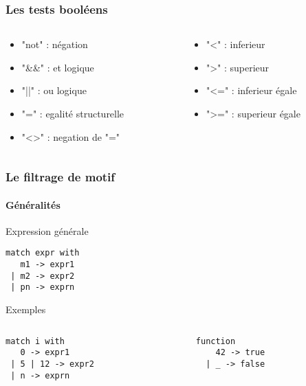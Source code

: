 \begin{frame}[fragile]
    \frametitle{Les tests booléens}
	\begin{columns}
		\begin{column}{5cm}
			\begin{itemize}
				\item "not" : négation
				\item "\&\&" : et logique
				\item "||" : ou logique
				\item "=" : egalité structurelle
				\item "<>" : negation de "="
			\end{itemize}
		\end{column}
		\begin{column}{5cm}
			\begin{itemize}
				\item "<" : inferieur 
				\item ">" : superieur
				\item "<=" : inferieur égale
				\item ">=" : superieur égale
			\end{itemize}
		\end{column}
	\end{columns}
\end{frame}

\begin{frame}[fragile]
	\frametitle{Le filtrage de motif}
	\framesubtitle{Généralités}
	\begin{block}{Expression générale}
		\begin{lstlisting}
match expr with
   m1 -> expr1
 | m2 -> expr2
 | pn -> exprn
		\end{lstlisting}
	\end{block}
	\begin{block}{Exemples}
		\begin{columns}
		\begin{column}{5cm}
		\begin{lstlisting}
match i with
   0 -> expr1
 | 5 | 12 -> expr2
 | n -> exprn
		\end{lstlisting}
		\end{column}
		\begin{column}{5cm}
		\begin{lstlisting}
function
    42 -> true
  | _ -> false
		\end{lstlisting} 
		\end{column}
	\end{columns}
	\end{block}
\end{frame}

